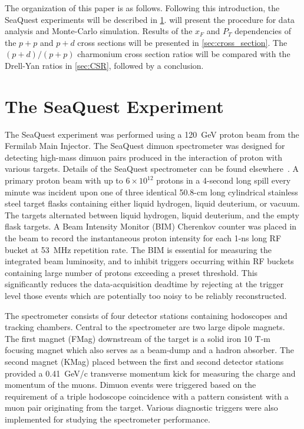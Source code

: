 \documentclass[reprint,aps,unsortedaddress,superscriptaddress,prd,floatfix,showpacs,linenumbers]{revtex4-2}
\begin{document}
The organization of this paper is as follows. Following this introduction, the 
SeaQuest experiments will be described in \cref{sec:SeaQuest}. 
will present the procedure for data analysis and Monte-Carlo simulation. Results
of the $x_F$ and $P_T$ dependencies of the $p+p$ and $p+d$ cross sections will
be presented in \cref{sec:cross_section}. The $(p+d)/(p+p)$ charmonium cross section
ratios will be compared with the Drell-Yan ratios in \cref{sec:CSR}, followed by a 
conclusion.

\section{The SeaQuest Experiment}
\label{sec:SeaQuest}
The SeaQuest experiment was performed using a \SI{120}{\GeV} proton beam from the 
Fermilab Main Injector. The SeaQuest dimuon spectrometer was designed for
detecting high-mass dimuon pairs produced in the interaction of proton
with various targets. Details of the SeaQuest spectrometer can be found
elsewhere~\cite{aidala2019}. A primary proton beam with up to $6 \times
10^{12}$ protons in a 4-second long spill every minute was incident upon one
of three identical 50.8-cm long cylindrical stainless steel
target flasks containing either liquid hydrogen, liquid deuterium,
or vacuum. The targets alternated between liquid hydrogen, liquid deuterium,
and the empty flask targets. A Beam Intensity Monitor (BIM) Cherenkov counter 
was placed in the beam to record the instantaneous proton intensity for 
each 1-ns long RF bucket at \SI{53}{\MHz} repetition rate. The BIM is essential
for measuring the integrated beam luminosity, and to inhibit triggers
occurring within RF buckets containing large number of protons 
exceeding a preset threshold. This significantly reduces the data-acquisition
deadtime by rejecting at the trigger level those events which are potentially
too noisy to be reliably reconstructed.  

The spectrometer consists of four detector stations containing
hodoscopes and tracking chambers.
Central to the spectrometer are two large dipole magnets. 
The first magnet (FMag) downstream of the target is a solid iron 10 
T-m focusing magnet which
also serves as a beam-dump and a hadron absorber. The second
magnet (KMag) placed between the first and second detector stations
provided a \SI{0.41}{\GeV/c} transverse momentum kick
for measuring the charge and momentum of the muons. Dimuon events
were triggered based on the requirement of a triple hodoscope
coincidence with a pattern consistent with a muon pair originating
from the target. Various diagnostic triggers were also implemented
for studying the spectrometer performance. 
\end{document}
